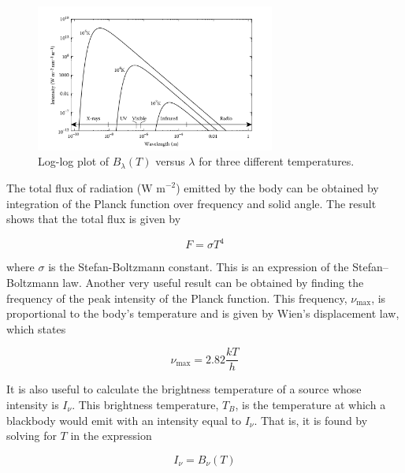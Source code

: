 \begin{figure}[H]
	\centering
	\includegraphics[width=0.7\textwidth]{Images/B_lambda_plot.png}
	\caption{Log-log plot of $B_{\lambda}(T)$ versus $\lambda$ for three different temperatures.}
	\label{fig:planckfunctionlambda}
\end{figure}

The total flux of radiation (\(\text{W m}^{-2}\)) emitted by the body can be obtained by integration of the Planck function over frequency and solid angle. The result shows that the total flux is given by

\begin{equation}
	F = \sigma T^4
	\label{eq:stefanboltzmannlaw}
\end{equation}

where \(\sigma\) is the Stefan-Boltzmann constant. This is an expression of the Stefan–Boltzmann law. Another very useful result can be obtained by finding the frequency of the peak intensity of the Planck function. This frequency, \(\nu_\text{max}\), is proportional to the body’s temperature and is given by Wien’s displacement law, which states

\[
\nu_\text{max} = 2.82 \frac{kT}{h}
\]

It is also useful to calculate the brightness temperature of a source whose intensity is \(I_\nu\). This brightness temperature, \(T_B\), is the temperature at which a blackbody would emit with an intensity equal to \(I_\nu\). That is, it is found by solving for \(T\) in the expression

\[
I_\nu = B_\nu(T)
\]



